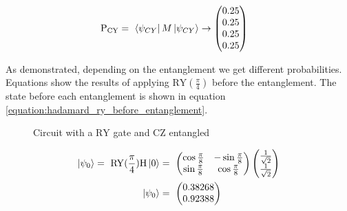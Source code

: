 \begin{equation}
    \centering
    \begin{split}
         \mathrm{P_{CY}} &=\ \bra{\psi_{CY}}M\ket{\psi_{CY}} \rightarrow \begin{pmatrix}
         0.25\\
         0.25\\
         0.25\\
         0.25\\
     \end{pmatrix}
    \end{split}
    \label{equation:cy_entanglement_with_ry}
\end{equation}

As demonstrated, depending on the entanglement we get different probabilities. Equations  show the results of applying $\mathrm{RY}\left(\frac{\pi}{4}\right)$ before the entanglement. The state before each entanglement is shown in equation \ref{equation:hadamard_ry_before_entanglement}.

\begin{figure}[!ht]
    \centering
    \caption{Circuit with a $\mathrm{RY}$ gate and $\mathrm{CZ}$ entangled}
    \label{fig:circuit_ry_gate_cz_entangled}
\end{figure}

\begin{equation}
        \centering
    \begin{split}
          \ket{\psi_0} =\ \mathrm{RY}(\frac{\pi}{4})\mathrm{H}\ket{0} &=\ \begin{pmatrix}
        \cos{\frac{\pi}{8}} & -\sin{\frac{\pi}{8}} \\
        \sin{\frac{\pi}{8}} & \cos{\frac{\pi}{8}}
    \end{pmatrix}\begin{pmatrix}\frac{1}{\sqrt{2}}\\\frac{1}{\sqrt{2}}\end{pmatrix} \\
    \ket{\psi_0} &=\ \begin{pmatrix}
     0.38268\\
     0.92388\\
     \end{pmatrix}
    \end{split}
    \label{equation:hadamard_ry_before_entanglement}
\end{equation}

